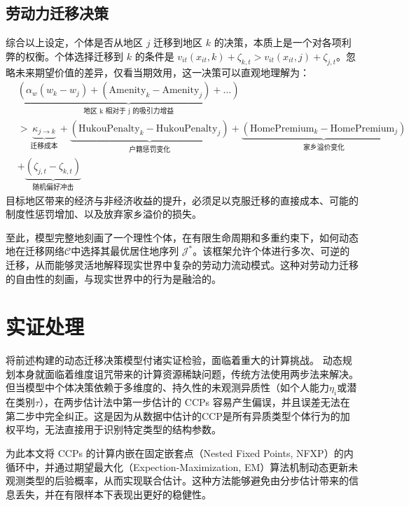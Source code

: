 \documentclass[master, final]{zufe-thesis}
\begin{document}
\section{劳动力迁移决策}

综合以上设定，个体是否从地区 $j$ 迁移到地区 $k$ 的决策，本质上是一个对各项利弊的权衡。个体选择迁移到 $k$ 的条件是 $v_{it}(x_{it}, k) + \zeta_{k,t} > v_{it}(x_{it}, j) + \zeta_{j,t}$。忽略未来期望价值的差异，仅看当期效用，这一决策可以直观地理解为：
\begin{equation}
\begin{split}
  & \underbrace{ \left( \alpha_w (w_k - w_j) + (\text{Amenity}_k - \text{Amenity}_j) + \dots \right) }_{\text{地区 k 相对于 j 的吸引力增益}} \\
  & > \underbrace{\kappa_{j \to k}}_{\text{迁移成本}} + \underbrace{ (\text{HukouPenalty}_k - \text{HukouPenalty}_j) }_{\text{户籍惩罚变化}} + \underbrace{ (\text{HomePremium}_k - \text{HomePremium}_j) }_{\text{家乡溢价变化}} \\
  & + \underbrace{ (\zeta_{j,t} - \zeta_{k,t}) }_{\text{随机偏好冲击}}
\end{split}
\label{eq:迁移motivation_revised}
\end{equation}
目标地区带来的经济与非经济收益的提升，必须足以克服迁移的直接成本、可能的制度性惩罚增加、以及放弃家乡溢价的损失。

至此，模型完整地刻画了一个理性个体，在有限生命周期和多重约束下，如何动态地在迁移网络$\mathcal{C}$中选择其最优居住地序列 $\mathcal{J}^*$。该框架允许个体进行多次、可逆的迁移，从而能够灵活地解释现实世界中复杂的劳动力流动模式。这种对劳动力迁移的自由性的刻画，与现实世界中的行为是融洽的。




\chapter{实证处理}

将前述构建的动态迁移决策模型付诸实证检验，面临着重大的计算挑战。
动态规划本身就面临着维度诅咒带来的计算资源稀缺问题，传统方法使用两步法来解决。但当模型中个体决策依赖于多维度的、持久性的未观测异质性（如个人能力$\eta_i$或潜在类别$\tau$），在两步估计法中第一步估计的 CCPs 容易产生偏误，并且误差无法在第二步中完全纠正。这是因为从数据中估计的CCP是所有异质类型个体行为的加权平均，无法直接用于识别特定类型的结构参数。

为此本文将 CCPs 的计算内嵌在固定嵌套点（Nested Fixed Points, NFXP）的内循环中，并通过期望最大化（Expection-Maximization, EM）算法机制动态更新未观测类型的后验概率，从而实现联合估计。这种方法能够避免由分步估计带来的信息丢失，并在有限样本下表现出更好的稳健性。
\end{document}
